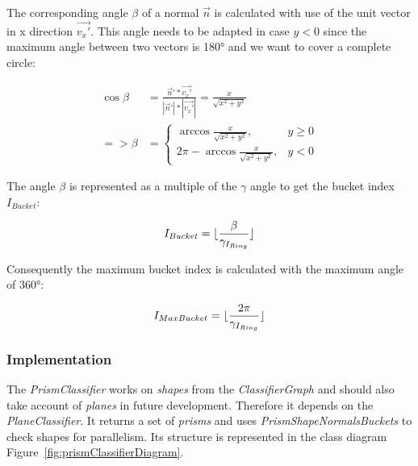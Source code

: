 \documentclass[../ClassicThesis.tex]{subfiles}
\begin{document}
The corresponding angle $ \beta $ of a normal $ \vec{n} $ is calculated with use of the unit vector in x direction $ \vec{v_{x}'} $. This angle needs to be adapted in case $ y < 0 $ since the maximum angle between two vectors is 180° and we want to cover a complete circle:

\begin{equation}
\begin{split}
    \cos{\beta} & = \frac{\vec{n}' * \vec{v_{x}'}}{|\vec{n}'| * |\vec{v_{x}'}|} = \frac{x}{\sqrt{x^{2} + y^{2}}} \\
    => \beta & = \begin{cases}
        \arccos{ \frac{x}{\sqrt{x^{2} + y^{2}}} }, & y \geq 0 \\
        2 \pi - \arccos{ \frac{x}{\sqrt{x^{2} + y^{2}}} }, & y < 0
    \end{cases}
\end{split}
\end{equation}

The angle $ \beta $ is represented as a multiple of the $ \gamma $ angle to get the bucket index $ I_{Bucket} $:

\begin{equation}
    I_{Bucket} = \lfloor\frac{\beta}{ {\gamma}_{I_{Ring}} }\rfloor
\end{equation}

Consequently the maximum bucket index is calculated with the maximum angle of 360°:

\begin{equation}
    I_{MaxBucket} = \lfloor\frac{2 \pi}{ {\gamma}_{I_{Ring}} }\rfloor
\end{equation}



\subsubsection{Implementation}

The \emph{PrismClassifier} works on \emph{shapes} from the \emph{ClassifierGraph} and should also take account of \emph{planes} in future development. Therefore it depends on the \emph{PlaneClassifier}. It returns a set of \emph{prisms} and uses \emph{PrismShapeNormalsBuckets} to check shapes for parallelism. Its structure is represented in the class diagram Figure~\ref{fig:prismClassifierDiagram}.
\end{document}
